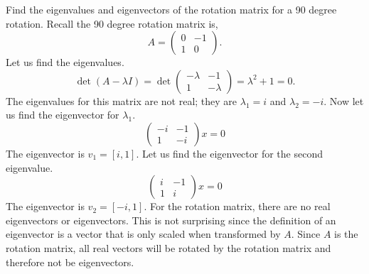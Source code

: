 \documentclass{article}
\begin{document}
Find the eigenvalues and eigenvectors of the rotation matrix for a 90 degree rotation. Recall the 90 degree rotation matrix is,
\begin{equation*}
    A = \begin{pmatrix}
        0 & -1 \\
        1 &  0
    \end{pmatrix}.
\end{equation*}
Let us find the eigenvalues.
\begin{equation*}
    \det (A - \lambda I)
    = \det\begin{pmatrix}
        - \lambda & - 1 \\
        1         & - \lambda
    \end{pmatrix}
    = \lambda^2 + 1 = 0.
\end{equation*}
The eigenvalues for this matrix are not real; they are $\lambda_1 = i$ and $\lambda_2 = -i$. Now let us find the eigenvector for $\lambda_1$.
\begin{equation*}
    \begin{pmatrix}
        - i & -1 \\
          1 & -i
    \end{pmatrix} x
    = 0
\end{equation*}
The eigenvector is $v_1 = [i, 1]$. Let us find the eigenvector for the second eigenvalue.
\begin{equation*}
    \begin{pmatrix}
          i & -1 \\
          1 &  i
    \end{pmatrix} x
    = 0
\end{equation*}
The eigenvector is $v_2 = [-i, 1]$. For the rotation matrix, there are no real eigenvectors or eigenvectors. This is not surprising since the definition of an eigenvector is a vector that is only scaled when transformed by $A$. Since $A$ is the rotation matrix, all real vectors will be rotated by the rotation matrix and therefore not be eigenvectors.



\end{document}
